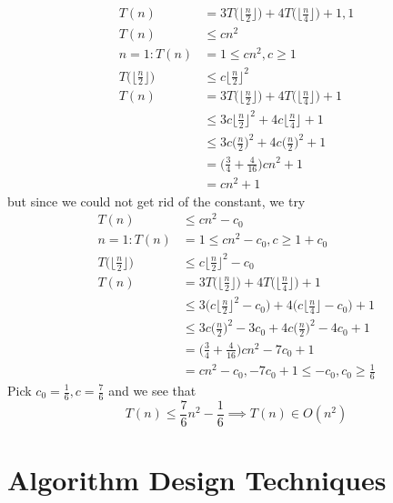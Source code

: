 \documentclass[12pt]{article}
\begin{document}
\begin{example}
\begin{align*}
T(n) &= 3T\bigg(\bigg\lfloor \frac{n}{2} \bigg\rfloor\bigg) + 4T\bigg(\bigg\lfloor \frac{n}{4} \bigg\rfloor\bigg) + 1, 1 \\
T(n) &\leq cn^2 \\
n = 1: T(n) &= 1 \leq cn^2, c \geq 1 \\
T\bigg(\bigg\lfloor \frac{n}{2} \bigg\rfloor\bigg) &\leq c\bigg\lfloor \frac{n}{2} \bigg\rfloor^2 \\
T(n) &= 3T\bigg(\bigg\lfloor \frac{n}{2} \bigg\rfloor\bigg) + 4T\bigg(\bigg\lfloor \frac{n}{4} \bigg\rfloor\bigg) + 1 \\
     &\leq 3c \bigg\lfloor \frac{n}{2} \bigg\rfloor^2 + 4c\bigg\lfloor \frac{n}{4} \bigg\rfloor + 1 \\
     &\leq 3c \bigg(\frac{n}{2}\bigg)^2 + 4c \bigg(\frac{n}{2}\bigg)^2 + 1 \\
     &= \bigg(\frac{3}{4} + \frac{4}{16}\bigg)cn^2 + 1 \\
     &= cn^2 + 1
\end{align*}
but since we could not get rid of the constant, we try
\begin{align*}
T(n) &\leq cn^2 - c_0 \\
n = 1: T(n) &= 1 \leq cn^2 - c_0, c \geq 1 + c_0 \\
T\bigg(\bigg\lfloor \frac{n}{2} \bigg\rfloor\bigg) &\leq c\bigg\lfloor \frac{n}{2} \bigg\rfloor^2 - c_0 \\
T(n) &= 3T\bigg(\bigg\lfloor \frac{n}{2} \bigg\rfloor\bigg) + 4T\bigg(\bigg\lfloor \frac{n}{4} \bigg\rfloor\bigg) + 1 \\
     &\leq 3\bigg(c \bigg\lfloor \frac{n}{2} \bigg\rfloor^2 - c_0\bigg) + 4\bigg(c\bigg\lfloor \frac{n}{4} \bigg\rfloor - c_0\bigg) + 1 \\
     &\leq 3c \bigg(\frac{n}{2}\bigg)^2 - 3c_0 + 4c \bigg(\frac{n}{2}\bigg)^2 - 4c_0 + 1 \\
     &= \bigg(\frac{3}{4} + \frac{4}{16}\bigg)cn^2 - 7c_0 + 1 \\
     &= cn^2 - c_0, -7c_0 + 1 \leq -c_0, c_0 \geq \frac{1}{6}
\end{align*}
Pick $c_0 = \frac{1}{6}, c = \frac{7}{6}$ and we see that \[ T(n) \leq \frac{7}{6}n^2 - \frac{1}{6} \implies T(n) \in O(n^2) \]
\end{example}

\section{Algorithm Design Techniques}
\end{document}
